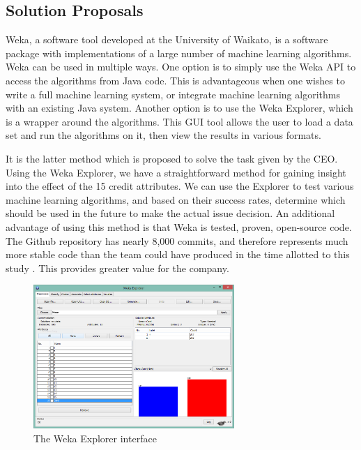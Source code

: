 \documentclass[11pt,journal]{IEEEtran}
\begin{document}
\subsection{Solution Proposals}
Weka, a software tool developed at the University of Waikato, is a software package with implementations of a large number of machine learning algorithms. Weka can be used in multiple ways. One option is to simply use the Weka API to access the algorithms from Java code. This is advantageous when one wishes to write a full machine learning system, or integrate machine learning algorithms with an existing Java system. Another option is to use the Weka Explorer, which is a wrapper around the algorithms. This GUI tool allows the user to load a data set and run the algorithms on it, then view the results in various formats.
\par
It is the latter method which is proposed to solve the task given by the CEO. Using the Weka Explorer, we have a straightforward method for gaining insight into the effect of the 15 credit attributes. We can use the Explorer to test various machine learning algorithms, and based on their success rates, determine which should be used in the future to make the actual issue decision. An additional advantage of using this method is that Weka is tested, proven, open-source code. The Github repository has nearly 8,000 commits, and therefore represents much more stable code than the team could have produced in the time allotted to this study \cite{wekagit}. This provides greater value for the company.

\begin{figure}[H]
\centering
    \includegraphics[width=3in]{images/wekaexplorer}
\caption{The Weka Explorer interface}
\label{wekaexplorer}
\end{figure}
\end{document}
